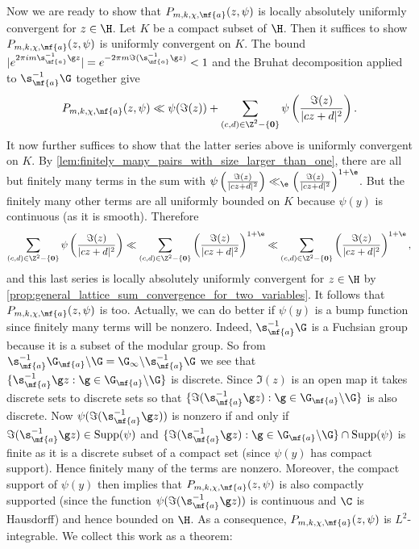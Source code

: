     Now we are ready to show that $P_{m,k,\chi,\mf{a}}(z,\psi)$ is locally absolutely uniformly convergent for $z \in \H$. Let $K$ be a compact subset of $\H$. Then it suffices to show $P_{m,k,\chi,\mf{a}}(z,\psi)$ is uniformly convergent on $K$. The bound $|e^{2\pi im\s_{\mf{a}}^{-1}\g z}| = e^{-2\pi m\Im(\s_{\mf{a}}^{-1}\g z)} < 1$ and the Bruhat decomposition applied to $\s_{\mf{a}}^{-1}\G$ together give
    \[
      P_{m,k,\chi,\mf{a}}(z,\psi) \ll \psi(\Im(z))+\sum_{\substack{(c,d) \in \Z^{2}-\{\mathbf{0}\}}}\psi\left(\frac{\Im(z)}{|cz+d|^{2}}\right).
    \]
    It now further suffices to show that the latter series above is uniformly convergent on $K$. By \cref{lem:finitely_many_pairs_with_size_larger_than_one}, there are all but finitely many terms in the sum with $\psi\left(\frac{\Im(z)}{|cz+d|^{2}}\right) \ll_{\e} \left(\frac{\Im(z)}{|cz+d|^{2}}\right)^{1+\e}$. But the finitely many other terms are all uniformly bounded on $K$ because $\psi(y)$ is continuous (as it is smooth). Therefore
    \[
      \sum_{(c,d) \in \Z^{2}-\{\mathbf{0}\}}\psi\left(\frac{\Im(z)}{|cz+d|^{2}}\right) \ll \sum_{(c,d) \in \Z^{2}-\{\mathbf{0}\}}\left(\frac{\Im(z)}{|cz+d|^{2}}\right)^{1+\e} \ll \sum_{(c,d) \in \Z^{2}-\{\mathbf{0}\}}\left(\frac{\Im(z)}{|cz+d|^{2}}\right)^{1+\e},
    \]
    and this last series is locally absolutely uniformly convergent for $z \in \H$ by \cref{prop:general_lattice_sum_convergence_for_two_variables}. It follows that $P_{m,k,\chi,\mf{a}}(z,\psi)$ is too. Actually, we can do better if $\psi(y)$ is a bump function since finitely many terms will be nonzero. Indeed, $\s_{\mf{a}}^{-1}\G$ is a Fuchsian group because it is a subset of the modular group. So from $\s_{\mf{a}}^{-1}\G_{\mf{a}}\backslash\G = \G_{\infty}\backslash\s_{\mf{a}}^{-1}\G$ we see that $\{\s_{\mf{a}}^{-1}\g z:\g \in \G_{\mf{a}}\backslash\G\}$ is discrete. Since $\Im(z)$ is an open map it takes discrete sets to discrete sets so that $\{\Im(\s_{\mf{a}}^{-1}\g z):\g \in \G_{\mf{a}}\backslash\G\}$ is also discrete. Now $\psi(\Im(\s_{\mf{a}}^{-1}\g z))$ is nonzero if and only if $\Im(\s_{\mf{a}}^{-1}\g z) \in \mathrm{Supp}(\psi)$ and $\{\Im(\s_{\mf{a}}^{-1}\g z):\g \in \G_{\mf{a}}\backslash\G\} \cap \mathrm{Supp}(\psi)$ is finite as it is a discrete subset of a compact set (since $\psi(y)$ has compact support). Hence finitely many of the terms are nonzero. Moreover, the compact support of $\psi(y)$ then implies that $P_{m,k,\chi,\mf{a}}(z,\psi)$ is also compactly supported (since the function $\psi(\Im(\s_{\mf{a}}^{-1}\g z))$ is continuous and $\C$ is Hausdorff) and hence bounded on $\H$. As a consequence, $P_{m,k,\chi,\mf{a}}(z,\psi)$ is $L^{2}$-integrable. We collect this work as a theorem:

